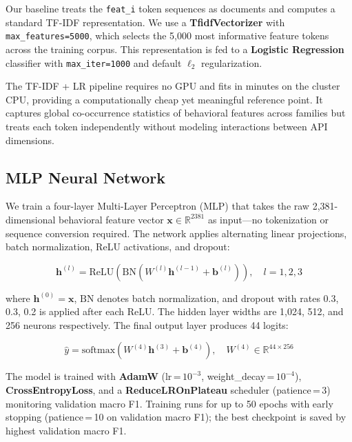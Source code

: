 \documentclass[11pt]{article}
\begin{document}
Our baseline treats the \texttt{feat\_i} token sequences as documents
and computes a standard TF-IDF representation. We use a
\textbf{TfidfVectorizer} with \texttt{max\_features=5000}, which selects
the 5,000 most informative feature tokens across the training corpus.
This representation is fed to a \textbf{Logistic Regression} classifier
with \texttt{max\_iter=1000} and default $\ell_2$ regularization.

The TF-IDF + LR pipeline requires no GPU and fits in minutes on the
cluster CPU, providing a computationally cheap yet meaningful reference
point. It captures global co-occurrence statistics of behavioral
features across families but treats each token independently without
modeling interactions between API dimensions.

\subsection{MLP Neural Network}

We train a four-layer Multi-Layer Perceptron (MLP) that takes the raw
2,381-dimensional behavioral feature vector $\mathbf{x} \in \mathbb{R}^{2381}$
as input—no tokenization or sequence conversion required. The network
applies alternating linear projections, batch normalization, ReLU
activations, and dropout:

\begin{equation}
  \mathbf{h}^{(l)} = \text{ReLU}\!\left(\text{BN}\!\left(
    W^{(l)}\mathbf{h}^{(l-1)} + \mathbf{b}^{(l)}\right)\right),
  \quad l = 1, 2, 3
\end{equation}

where $\mathbf{h}^{(0)} = \mathbf{x}$, $\text{BN}$ denotes batch
normalization, and dropout with rates 0.3, 0.3, 0.2 is applied after
each ReLU. The hidden layer widths are 1,024, 512, and 256 neurons
respectively. The final output layer produces 44 logits:

\begin{equation}
  \hat{y} = \text{softmax}\!\left(W^{(4)}\mathbf{h}^{(3)} + \mathbf{b}^{(4)}\right),
  \quad W^{(4)} \in \mathbb{R}^{44 \times 256}
\end{equation}

The model is trained with \textbf{AdamW} (lr\,=\,$10^{-3}$,
weight\_decay\,=\,$10^{-4}$), \textbf{CrossEntropyLoss}, and a
\textbf{ReduceLROnPlateau} scheduler (patience\,=\,3) monitoring
validation macro F1. Training runs for up to 50 epochs with early
stopping (patience\,=\,10 on validation macro F1); the best checkpoint
is saved by highest validation macro F1.
\end{document}
